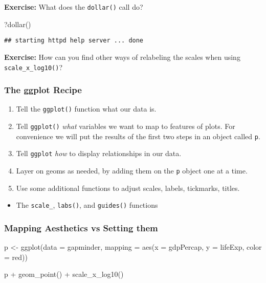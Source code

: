 \documentclass[
]{article}
\newenvironment{Shaded}{\begin{snugshade}}{\end{snugshade}}
\newcommand{\AttributeTok}[1]{\textcolor[rgb]{0.77,0.63,0.00}{#1}}
\newcommand{\FunctionTok}[1]{\textcolor[rgb]{0.00,0.00,0.00}{#1}}
\newcommand{\NormalTok}[1]{#1}
\newcommand{\OtherTok}[1]{\textcolor[rgb]{0.56,0.35,0.01}{#1}}
\newcommand{\SpecialCharTok}[1]{\textcolor[rgb]{0.00,0.00,0.00}{#1}}
\newcommand{\StringTok}[1]{\textcolor[rgb]{0.31,0.60,0.02}{#1}}
\providecommand{\tightlist}{%
  \setlength{\itemsep}{0pt}\setlength{\parskip}{0pt}}
\begin{document}
\textbf{Exercise:} What does the \texttt{dollar()} call do?

\begin{Shaded}
\begin{Highlighting}[]
\NormalTok{?}\FunctionTok{dollar}\NormalTok{()}
\end{Highlighting}
\end{Shaded}

\begin{verbatim}
## starting httpd help server ... done
\end{verbatim}

\textbf{Exercise:} How can you find other ways of relabeling the scales
when using \texttt{scale\_x\_log10()}?

\hypertarget{the-ggplot-recipe}{%
\subsubsection{The ggplot Recipe}\label{the-ggplot-recipe}}

\begin{enumerate}
\def\labelenumi{\arabic{enumi}.}
\tightlist
\item
  Tell the \texttt{ggplot()} function what our data is.
\item
  Tell \texttt{ggplot()} \emph{what} variables we want to map to
  features of plots. For convenience we will put the results of the
  first two steps in an object called \texttt{p}.
\item
  Tell \texttt{ggplot} \emph{how} to display relationships in our data.
\item
  Layer on geoms as needed, by adding them on the \texttt{p} object one
  at a time.
\item
  Use some additional functions to adjust scales, labels, tickmarks,
  titles.
\end{enumerate}

\begin{itemize}
\tightlist
\item
  The \texttt{scale\_}, \texttt{labs()}, and \texttt{guides()} functions
\end{itemize}

\hypertarget{mapping-aesthetics-vs-setting-them}{%
\subsubsection{Mapping Aesthetics vs Setting
them}\label{mapping-aesthetics-vs-setting-them}}

\begin{Shaded}
\begin{Highlighting}[]
\NormalTok{p }\OtherTok{\textless{}{-}} \FunctionTok{ggplot}\NormalTok{(}\AttributeTok{data =}\NormalTok{ gapminder,}
            \AttributeTok{mapping =} \FunctionTok{aes}\NormalTok{(}\AttributeTok{x =}\NormalTok{ gdpPercap, }\AttributeTok{y =}\NormalTok{ lifeExp, }\AttributeTok{color =} \StringTok{\textquotesingle{}red\textquotesingle{}}\NormalTok{))}

\NormalTok{p }\SpecialCharTok{+} \FunctionTok{geom\_point}\NormalTok{() }\SpecialCharTok{+} \FunctionTok{scale\_x\_log10}\NormalTok{()}
\end{Highlighting}
\end{Shaded}
\end{document}
